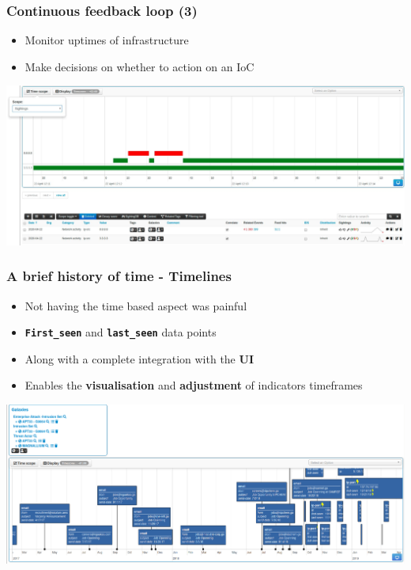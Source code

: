 \begin{frame}
  \frametitle{Continuous feedback loop (3)}
  \begin{itemize}
      \item Monitor uptimes of infrastructure
      \item Make decisions on whether to action on an IoC
  \end{itemize}
  \begin{center}
    \includegraphics[scale=0.18]{timeline.jpeg}
  \end{center}
\end{frame}

\begin{frame}
  \frametitle{A brief history of time - Timelines}
  \begin{itemize}
    \item Not having the time based aspect was painful
    \item {\bf \texttt{First\_seen}} and {\bf \texttt{last\_seen}} data points
    \item Along with a complete integration with the {\bf UI}
    \item Enables the {\bf visualisation} and {\bf adjustment} of indicators timeframes 
  \end{itemize}
  \begin{center}
    \includegraphics[width=1.0\linewidth]{timeline-misp-overview.png}
  \end{center}
\end{frame}

